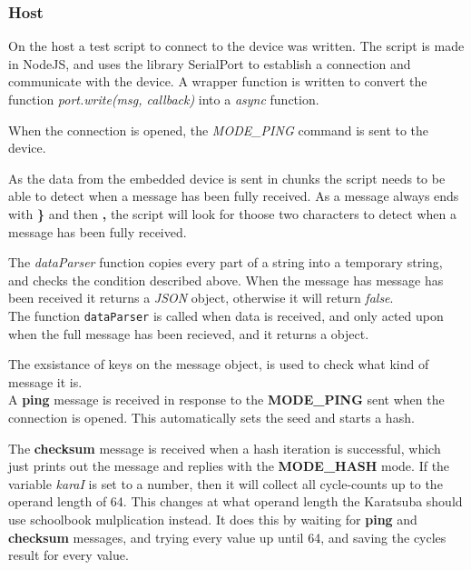\subsubsection{Host}
On the host a test script to connect to the device was written. The script is made in NodeJS\cite{nodejs}, and uses the library SerialPort\cite{serialport} to establish a connection and communicate with the device.
A wrapper function is written to convert the function \textit{port.write(msg, callback)} into a \textit{async} function. 

\medskip
When the connection is opened, the \textit{MODE\_PING} command is sent to the device.

\medskip
As the data from the embedded device is sent in chunks the script needs to be able to detect when a message has been fully received. As a message always ends with \textbf{\}} and then \textbf{,} the script will look for thoose two characters to detect when a message has been fully received.

The \textit{dataParser} function copies every part of a string into a temporary string, and checks the condition described above. When the message has message has been received it returns a \textit{JSON} object, otherwise it will return \textit{false}.\medskip
\\
The function \texttt{dataParser} is called when data is received, and only acted upon when the full message has been recieved, and it returns a object.  

\medskip
The exsistance of keys on the message object, is used to check what kind of message it is.\\
\medskip
A \textbf{ping} message is received in response to the \textbf{MODE\_PING} sent when the connection is opened. This automatically sets the seed and starts a hash.

\medskip
The \textbf{checksum} message is received when a hash iteration is successful, which just prints out the message and replies with the \textbf{MODE\_HASH} mode.
\label{karatTesting}
If the variable \textit{karaI} is set to a number, then it will collect all cycle-counts up to the operand length of 64. This changes at what operand length the Karatsuba should use schoolbook mulplication instead. It does this by waiting for \textbf{ping} and \textbf{checksum} messages, and trying every value up until 64, and saving the cycles result for every value.

\pagebreak
